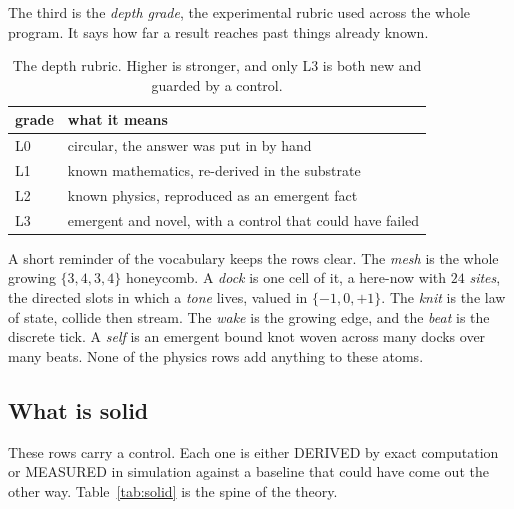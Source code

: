 The third is the \emph{depth grade}, the experimental rubric used across the whole program. It says how far a result reaches past things already known.

\begin{table}[ht]
\centering
\begin{tabular}{@{}ll@{}}
\toprule
grade & what it means \\
\midrule
L0 & circular, the answer was put in by hand \\
L1 & known mathematics, re-derived in the substrate \\
L2 & known physics, reproduced as an emergent fact \\
L3 & emergent and novel, with a control that could have failed \\
\bottomrule
\end{tabular}
\caption{The depth rubric. Higher is stronger, and only L3 is both new and guarded by a control.}
\label{tab:depth}
\end{table}

A short reminder of the vocabulary keeps the rows clear. The \emph{mesh} is the whole growing $\{3,4,3,4\}$ honeycomb. A \emph{dock} is one cell of it, a here-now with $24$ \emph{sites}, the directed slots in which a \emph{tone} lives, valued in $\{-1,0,+1\}$. The \emph{knit} is the law of state, collide then stream. The \emph{wake} is the growing edge, and the \emph{beat} is the discrete tick. A \emph{self} is an emergent bound knot woven across many docks over many beats. None of the physics rows add anything to these atoms.

\subsection{What is solid}

These rows carry a control. Each one is either DERIVED by exact computation or MEASURED in simulation against a baseline that could have come out the other way. Table~\ref{tab:solid} is the spine of the theory.

